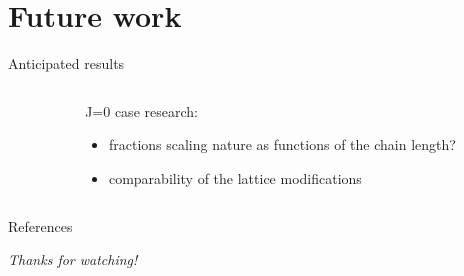 \documentclass{beamer}
\begin{document}
\section{Future work}

\begin{frame}{Anticipated results}
\begin{columns}[t]
    \begin{column}{.45\textwidth}
    \end{column}
    \begin{column}{.45\textwidth}
	\alert{J=0 case research}:
      \begin{itemize}
        \item fractions scaling nature as functions of the chain length?  
        \item comparability of the lattice modifications
      \end{itemize}
    \end{column}
  \end{columns}
\end{frame}

\begin{frame}{References}




\end{frame}

\begin{frame}

\begin{center}

\textit{ \LARGE Thanks for watching!}
\end{center}

\end{frame}
\end{document}
